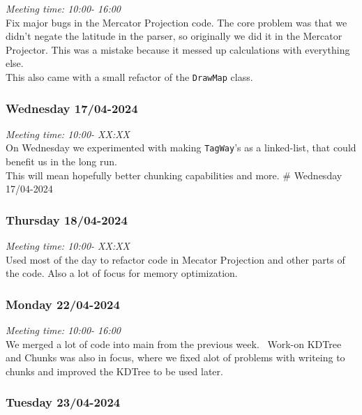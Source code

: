 \emph{Meeting time: 10:00- 16:00 }\\
Fix major bugs in the Mercator Projection code. The core problem was
that we didn't negate the latitude in the parser, so originally we did
it in the Mercator Projector. This was a mistake because it messed up
calculations with everything else.\\
This also came with a small refactor of the \texttt{DrawMap} class.

\hypertarget{wednesday-1704-2024}{%
\subsubsection*{Wednesday 17/04-2024}\label{wednesday-1704-2024}}

\emph{Meeting time: 10:00- XX:XX }\\
On Wednesday we experimented with making \texttt{TagWay}'s as a
linked-list, that could benefit us in the long run.\\
This will mean hopefully better chunking capabilities and more. \#
Wednesday 17/04-2024

\hypertarget{thursday-1804-2024}{%
\subsubsection*{Thursday 18/04-2024}\label{thursday-1804-2024}}

\emph{Meeting time: 10:00- XX:XX }\\
Used most of the day to refactor code in Mecator Projection and other
parts of the code. Also a lot of focus for memory optimization.

\hypertarget{monday-2204-2024}{%
\subsubsection*{Monday 22/04-2024}\label{monday-2204-2024}}

\emph{Meeting time: 10:00- 16:00 }\\
We merged a lot of code into main from the previous week.~ Work-on
KDTree and Chunks was also in focus, where we fixed alot of problems
with writeing to chunks and improved the KDTree to be used later.

\hypertarget{tuesday-2304-2024}{%
\subsubsection*{Tuesday 23/04-2024}\label{tuesday-2304-2024}}


